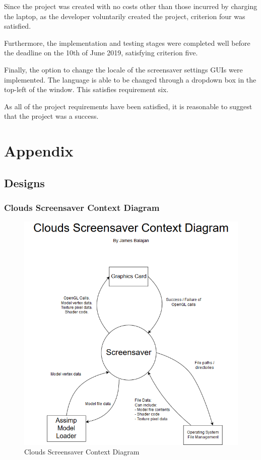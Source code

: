\documentclass[10pt, openany]{book}
\begin{document}
Since the project was created with no costs other than those incurred by charging the laptop, as the developer voluntarily created the project, criterion four was satisfied.

Furthermore, the implementation and testing stages were completed well before the deadline on the 10th of June 2019, satisfying criterion five.

Finally, the option to change the locale of the screensaver settings GUIs were implemented. The language is able to be changed through a dropdown box in the top-left of the window. This satisfies requirement six.

As all of the project requirements have been satisfied, it is reasonable to suggest that the project was a success.

\printbibliography[heading=bibintoc,title={Bibliography}]

\printglossaries

\chapter{Appendix}
\section{Designs}
\subsection{Clouds Screensaver Context Diagram}
\begin{figure}[H]
	\centering
	\includegraphics[width=0.9\linewidth]{Clouds Context Diagram}
	\caption{Clouds Screensaver Context Diagram}
	\label{app:clouds-context}
\end{figure}
\newpage
\end{document}
